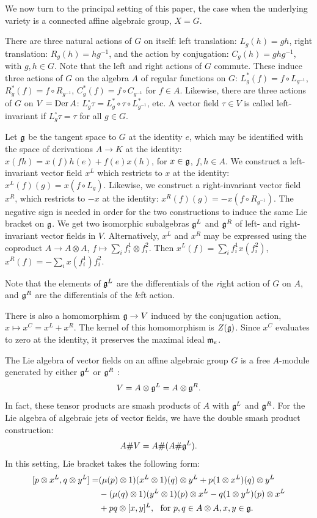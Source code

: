 \documentclass[12pt]{amsart}
\begin{document}
We now turn to the principal setting of this paper, the case when the underlying variety is a connected affine algebraic group, $X = G$.

There are three natural actions of $G$ on itself: left translation: $L_g (h) = gh$, right translation: $R_g (h) = hg^{-1}$, and the action by conjugation: $C_g (h) = g h g^{-1}$, with $g, h \in G$. 
Note that the left and right actions of $G$ commute.
These induce three actions of $G$ on the algebra $A$ of regular functions on $G$:  $L^*_g (f) = f \circ L_{g^{-1}}$, $R^*_g (f) = f \circ R_{g^{-1}}$, $C^*_g (f) = f \circ C_{g^{-1}}$  for $f \in A$. 
Likewise, there are three actions of $G$ on $V = \textup{Der\,} A$: $L^\circ_g \tau = L^*_g \circ \tau \circ L^*_{g^{-1}}$, etc. A vector field $\tau \in V$ is called left-invariant if $L^\circ_g \tau = \tau$ for all $g \in G$. 

Let $\mathfrak{g}$ be the tangent space to $G$ at the identity $e$, which may be identified with the space of derivations $A \rightarrow K$ at the identity: $x(fh) = x(f) h(e) + f(e) x(h)$, for $x \in \mathfrak{g}$, $f, h \in A$. We construct a left-invariant vector field $x^L$ which restricts to $x$ at the identity: $x^L (f) (g) = x(f \circ L_g)$. Likewise, we construct a right-invariant vector field $x^R$, which restricts to $-x$ at the identity: $x^R (f) (g) = - x(f \circ R_{g^{-1}})$. The negative sign is needed in order for the two constructions to induce the same Lie bracket on $\mathfrak{g}$. We get two isomorphic subalgebras $\mathfrak{g}^L$ and $\mathfrak{g}^R$ of left- and right-invariant vector fields in $V$. Alternatively, $x^L$ and $x^R$ may be expressed using the coproduct $A \rightarrow A \otimes A$, $f \mapsto \sum_i f^1_i \otimes f^2_i$. Then $x^L(f) = \sum_i f^1_i  x(f^2_i)$, $x^R(f) = -\sum_i x(f^1_i)  f^2_i$.

Note that the elements of $\mathfrak{g}^L$ are the differentials of the {\emph right} action of $G$ on $A$, and $\mathfrak{g}^R$ are the differentials of the {\emph left} action.

There is also a homomorphism $\mathfrak{g} \rightarrow V$ induced by the conjugation action, $x \mapsto x^C = x^L + x^R$. The kernel of this homomorphism is $Z(\mathfrak{g})$. Since $x^C$ evaluates to zero at the identity, it preserves the maximal ideal $\mathfrak{m}_e$.

The Lie algebra of vector fields on an affine algebraic group $G$ is a free $A$-module generated by either $\mathfrak{g}^L$ or $\mathfrak{g}^R$ \cite{BF}:
$$V = A \otimes \mathfrak{g}^L = A \otimes \mathfrak{g}^R.$$ 
In fact, these tensor products are smash products of $A$ with $\mathfrak{g}^L$ and $\mathfrak{g}^R$. For the Lie algebra of algebraic jets of vector fields, we have the double smash product construction:
$$A \# V = A \# (A \# \mathfrak{g}^L).$$
In this setting, Lie bracket takes the following form:
\begin{align}
\label{doublesmash}
[p \otimes x^L, q \otimes y^L] =& (\mu(p) \otimes 1) (x^L \otimes 1)(q) \otimes y^L
+ p (1 \otimes x^L)(q)\otimes y^L \\
&- (\mu(q) \otimes 1) (y^L \otimes 1)(p) \otimes x^L 
- q (1 \otimes y^L)(p)\otimes x^L \nonumber\\
&+ pq \otimes [x,y]^L, \  \ \text{for } p,q \in A\otimes A, x,y \in \mathfrak{g}. \nonumber
\end{align}
\end{document}
